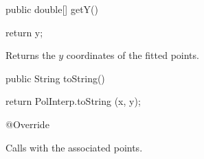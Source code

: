 \begin{code}

   public double[] getY()\begin{hide} {
      return y;
   }\end{hide}
\end{code}
\begin{tabb}   Returns the $y$ coordinates of the fitted points.
\end{tabb}
\begin{htmlonly}
\end{htmlonly}
\begin{code}

   public String toString()\begin{hide} {
      return PolInterp.toString (x, y);
   }

   @Override
\end{hide}
\end{code}
\begin{tabb}   Calls 
 with the associated points.
\end{tabb}
\begin{htmlonly}
\end{htmlonly}
\begin{code}\begin{hide}

   public LeastSquares clone() {
      final LeastSquares ls = (LeastSquares) super.clone ();
      ls.x = x.clone ();
      ls.y = y.clone ();
      return ls;
   }
}\end{hide}
\end{code}
